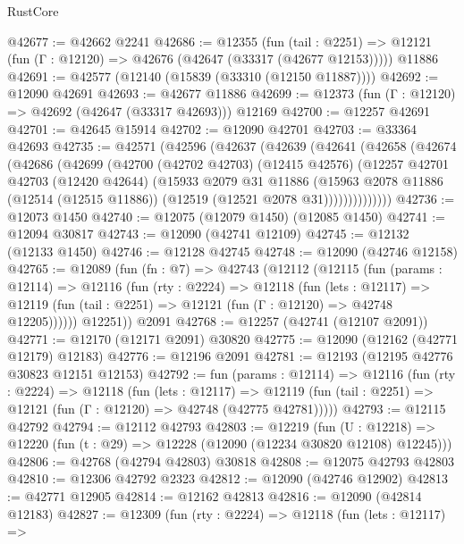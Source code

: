 \begin{lexlean}{RustCore}
\begin{coremodule}
@42677 := @42662 @2241
@42686 := @12355
    (fun (tail : @2251) => @12121 (fun (Γ : @12120) => @42676 (@42647 (@33317 (@42677 @12153)))))
    @11886
@42691 := @42577 (@12140 (@15839 (@33310 (@12150 @11887))))
@42692 := @12090 @42691
@42693 := @42677 @11886
@42699 := @12373 (fun (Γ : @12120) => @42692 (@42647 (@33317 @42693))) @12169
@42700 := @12257 @42691
@42701 := @42645 @15914
@42702 := @12090 @42701
@42703 := @33364 @42693
@42735 := @42571
    (@42596
      (@42637
        (@42639
          (@42641
            (@42658
              (@42674
                (@42686
                  (@42699
                    (@42700
                      (@42702 @42703)
                      (@12415 @42576)
                      (@12257
                        @42701
                        @42703
                        (@12420 @42644)
                        (@15933
                          @2079
                          @31
                          @11886
                          (@15963
                            @2078
                            @11886
                            (@12514 (@12515 @11886))
                            (@12519 (@12521 @2078 @31))))))))))))))
@42736 := @12073 @1450
@42740 := @12075 (@12079 @1450) (@12085 @1450)
@42741 := @12094 @30817
@42743 := @12090 (@42741 @12109)
@42745 := @12132 (@12133 @1450)
@42746 := @12128 @42745
@42748 := @12090 (@42746 @12158)
@42765 := @12089
    (fun (fn : @7) =>
    @42743
      (@12112
        (@12115
          (fun (params : @12114) =>
          @12116
            (fun (rty : @2224) =>
            @12118
              (fun (lets : @12117) =>
              @12119 (fun (tail : @2251) => @12121 (fun (Γ : @12120) => @42748 @12205))))))
        @12251))
    @2091
@42768 := @12257 (@42741 (@12107 @2091))
@42771 := @12170 (@12171 @2091) @30820
@42775 := @12090 (@12162 (@42771 @12179) @12183)
@42776 := @12196 @2091
@42781 := @12193 (@12195 @42776 @30823 @12151 @12153)
@42792 := fun (params : @12114) =>
  @12116
    (fun (rty : @2224) =>
    @12118
      (fun (lets : @12117) =>
      @12119 (fun (tail : @2251) => @12121 (fun (Γ : @12120) => @42748 (@42775 @42781)))))
@42793 := @12115 @42792
@42794 := @12112 @42793
@42803 := @12219
    (fun (U : @12218) => @12220 (fun (t : @29) => @12228 (@12090 (@12234 @30820 @12108) @12245)))
@42806 := @42768 (@42794 @42803) @30818
@42808 := @12075 @42793 @42803
@42810 := @12306 @42792 @2323
@42812 := @12090 (@42746 @12902)
@42813 := @42771 @12905
@42814 := @12162 @42813
@42816 := @12090 (@42814 @12183)
@42827 := @12309
    (fun (rty : @2224) =>
    @12118
      (fun (lets : @12117) =>

\end{coremodule}
\end{lexlean}
